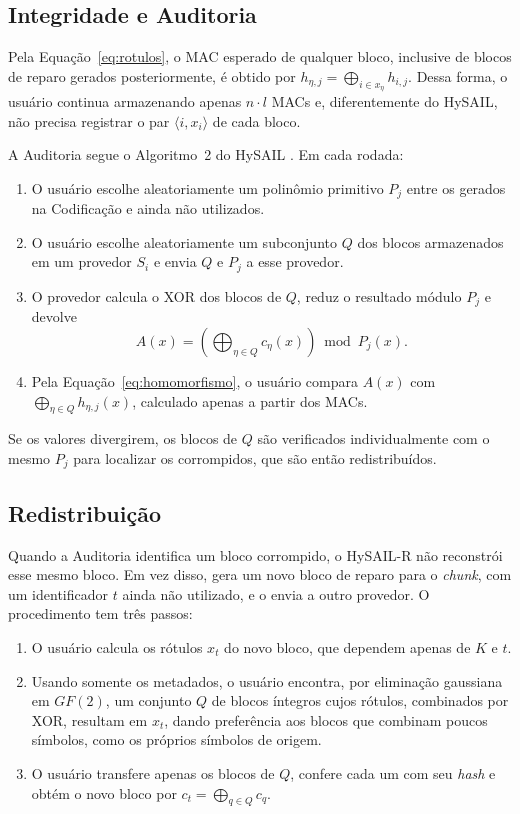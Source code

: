 \documentclass[portuguese]{sbc2025}%
\begin{document}
\subsection{Integridade e Auditoria}

Pela Equação~\eqref{eq:rotulos}, o MAC esperado de qualquer bloco, inclusive de blocos de reparo gerados posteriormente, é obtido por $h_{\eta,j} = \bigoplus_{i \in x_\eta} h_{i,j}$. Dessa forma, o usuário continua armazenando apenas $n \cdot l$ MACs e, diferentemente do HySAIL, não precisa registrar o par $\langle i, x_i \rangle$ de cada bloco.

A Auditoria segue o Algoritmo~2 do HySAIL \citep{amaral2019hysail}. Em cada rodada:
\begin{enumerate}
	\item O usuário escolhe aleatoriamente um polinômio primitivo $P_j$ entre os gerados na Codificação e ainda não utilizados.
	\item O usuário escolhe aleatoriamente um subconjunto $Q$ dos blocos armazenados em um provedor $S_i$ e envia $Q$ e $P_j$ a esse provedor.
	\item O provedor calcula o XOR dos blocos de $Q$, reduz o resultado módulo $P_j$ e devolve
\begin{equation}
A(x) = \textstyle\left(\bigoplus_{\eta \in Q} c_\eta(x)\right) \bmod P_j(x).
\label{eq:auditoria}
\end{equation}
	\item Pela Equação~\eqref{eq:homomorfismo}, o usuário compara $A(x)$ com $\bigoplus_{\eta \in Q} h_{\eta,j}(x)$, calculado apenas a partir dos MACs.
\end{enumerate}
Se os valores divergirem, os blocos de $Q$ são verificados individualmente com o mesmo $P_j$ para localizar os corrompidos, que são então redistribuídos.

\subsection{Redistribuição}

Quando a Auditoria identifica um bloco corrompido, o HySAIL-R não reconstrói esse mesmo bloco. Em vez disso, gera um novo bloco de reparo para o \emph{chunk}, com um identificador $t$ ainda não utilizado, e o envia a outro provedor. O procedimento tem três passos:
\begin{enumerate}
	\item O usuário calcula os rótulos $x_t$ do novo bloco, que dependem apenas de $K$ e $t$.
	\item Usando somente os metadados, o usuário encontra, por eliminação gaussiana em $GF(2)$, um conjunto $Q$ de blocos íntegros cujos rótulos, combinados por XOR, resultam em $x_t$, dando preferência aos blocos que combinam poucos símbolos, como os próprios símbolos de origem.
	\item O usuário transfere apenas os blocos de $Q$, confere cada um com seu \emph{hash} e obtém o novo bloco por $c_t = \bigoplus_{q \in Q} c_q$.
\end{enumerate}
\end{document}
